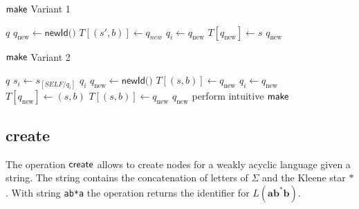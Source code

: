 \begin{minipage}{0.46\textwidth}
\begin{algorithm}[H]
\centering
\caption{$\operatorname{\textsf{make}}$ Variant 1}\label{alg:makev1}
\begin{algorithmic}[1]
\Return $q$
\Else
\State $q_{\text{new}} \gets \textsf{newId()}$
\State $T[(s',b)] \gets q_{new}$
\EndFor
{}
\State $q_{i} \gets q_{\text{new}}$
\EndIf
\EndFor
\State $T[q_{\text{new}}] \gets s$
\Return $q_{\text{new}}$
\EndIf
\end{algorithmic}
\end{algorithm}
\end{minipage}
\hfill
\begin{minipage}{0.46\textwidth}
\begin{algorithm}[H]
\caption{$\operatorname{\textsf{make}}$ Variant 2}\label{alg:makev2}
\begin{algorithmic}[1]
\Return $q$
\EndIf
{}
\State $s_{i} \gets s_{[SELF / q_{i}]}$
\Return $q_{i}$
\EndIf
\EndFor
\State $q_{\text{new}} \gets \textsf{newId()}$
\State $T[(s,b)] \gets q_{\text{new}}$
\State $q_{i} \gets q_{\text{new}}$
\EndIf
\EndFor
\State $T[q_{\text{new}}] \gets (s,b)$
\State $T[(s,b)] \gets q_{\text{new}}$
\Return $q_{\text{new}}$
\Else
\State perform intuitive $\operatorname{\textsf{make}}$
\EndIf
\end{algorithmic}
\end{algorithm}
\end{minipage}

\subsection{create}
The operation $\operatorname{\textsf{create}}$ allows to create nodes for a weakly acyclic language given a string. The string contains the concatenation of letters of $\Sigma$ and the Kleene star $*$. With string \texttt{ab*a} the operation returns the identifier for $L(\bm{ab^{*}b})$.

